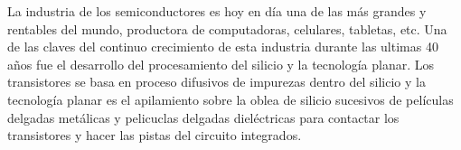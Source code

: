 
		La industria de los semiconductores es hoy en día una de las más grandes y rentables del mundo, productora de computadoras, celulares, tabletas, etc. Una de las claves del continuo crecimiento de esta industria durante las ultimas 40 años fue el desarrollo del procesamiento del silicio y la tecnología planar. Los transistores se basa en proceso difusivos de impurezas dentro del silicio y la tecnología planar es el apilamiento sobre la oblea de silicio sucesivos de películas delgadas metálicas y  pelicuclas delgadas dieléctricas para contactar los transistores y hacer las pistas del circuito integrados. 








